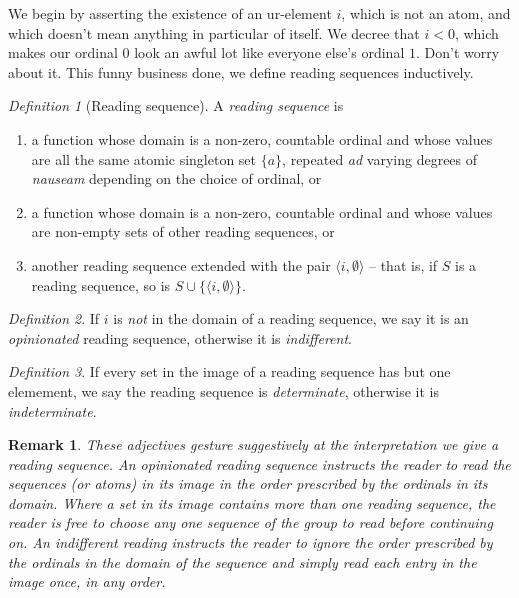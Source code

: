 \documentclass{amsart}
\newtheorem{rem}{Remark}
\theoremstyle{remark}
\newtheorem{defn}{Definition}
\begin{document}
We begin by asserting the existence of an ur-element $i$, which is not an atom, and which doesn't mean anything in particular of itself. We decree that $i<0$, which makes our ordinal $0$ look an awful lot like everyone else's ordinal $1$. Don't worry about it. This funny business done, we define reading sequences inductively.
\begin{defn}[Reading sequence]A \emph{reading sequence} is
  \begin{enumerate}
    \item  a function whose domain is a non-zero, countable ordinal and whose values are all the same atomic singleton set $\{a\} $, repeated \emph{ad} varying degrees of \emph{nauseam} depending on the choice of ordinal, or    
    \item  a function whose domain is a non-zero, countable ordinal and whose values are non-empty sets of other reading sequences, or
    \item  another reading sequence extended with the pair $\langle i,\emptyset\rangle$ -- that is, if $S$ is a reading sequence, so is $S\cup\{\langle i,\emptyset\rangle\}$. 
  \end{enumerate}
\end{defn}
\begin{defn}If $i$ is \emph{not} in the domain of a reading sequence, we say it is an \emph{opinionated} reading sequence, otherwise it is \emph{indifferent}.\end{defn}
\begin{defn}If every set in the image of a reading sequence has but one elemement, we say the reading sequence is \emph{determinate}, otherwise it is \emph{indeterminate}.\end{defn}%

\begin{rem}These adjectives gesture suggestively at the interpretation we give a reading sequence. An opinionated reading sequence instructs the reader to read the sequences (or atoms) in its image in the order prescribed by the ordinals in its domain. Where a set in its image contains more than one reading sequence, the reader is free to choose any one sequence of the group to read before continuing on. An indifferent reading instructs the reader to ignore the order prescribed by the ordinals in the domain of the sequence and simply read each entry in the image once, in any order.\end{rem}
\end{document}
